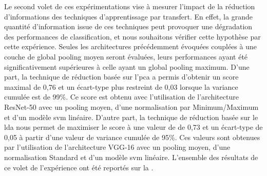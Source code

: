 Le second volet de ces expérimentations vise à mesurer l'impact de la réduction d'informations des techniques d'apprentissage par transfert. En effet, la grande quantité d'information issue de ces techniques peut provoquer une dégradation des performances de classification, et nous souhaitons vérifier cette hypothèse par cette expérience. Seules les architectures précédemment évoquées couplées à une couche de global pooling moyen seront évaluées, leurs performances ayant été significativement supérieures à celle ayant un global pooling maximum. D'une part, la technique de réduction basée sur l'\gls{pca} a permis d'obtenir un score maximal de 0,76 et un écart-type plus restreint de 0,03 lorsque la variance cumulée est de 99\%. Ce score est obtenu avec l'utilisation de l'architecture ResNet-50 avec un pooling moyen, d'une normalisation par Minimum/Maximum et d'un modèle \gls{svm} linéaire. D'autre part, la technique de réduction basée sur le \gls{lda} nous permet de maximiser le score à une valeur de de 0,73 et un écart-type de 0,05 à partir d'une valeur de variance cumulée de 95\%. Ces valeurs sont obtenues par l'utilisation de l'architecture VGG-16 avec un pooling moyen, d'une normalisation Standard et d'un modèle \gls{svm} linéaire. L'ensemble des résultats de ce volet de l'expérience ont été reportés sur la .\par

